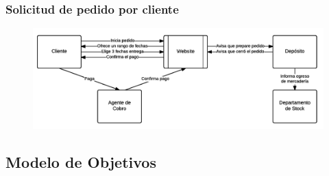     \clearpage
    \subsubsection{Solicitud de pedido por cliente}
    \begin{figure}[H]
      \includegraphics[width=\linewidth]{images/solicitud-de-pedido-por-cliente.png}
    \end{figure}

  \clearpage
  \subsection{Modelo de Objetivos}
  \fixme

  